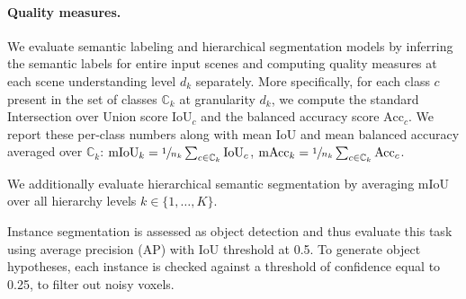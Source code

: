 

\paragraph{Quality measures. }
\label{results:metrics}
We evaluate semantic labeling and hierarchical segmentation models by inferring the semantic labels for entire input scenes and computing quality measures at each scene understanding level $d_k$ separately. 
More specifically, for each class $c$ present in the set of classes $\mathbb{C}_k$ at granularity $d_k$, we compute the standard Intersection over Union score $\text{IoU}_c$ and the balanced accuracy score $\text{Acc}_c$.
We report these per-class numbers along with mean IoU and mean balanced accuracy averaged over $\mathbb{C}_k$: $\text{mIoU}_k = \sfrac{1}{n_k}\sum_{c \in \mathbb{C}_k} \text{IoU}_c$, $\text{mAcc}_k = \sfrac{1}{n_k}\sum_{c \in \mathbb{C}_k} \text{Acc}_c$.

We additionally evaluate hierarchical semantic segmentation by averaging mIoU over all hierarchy levels $k \in \{1, \ldots, K\}$.

Instance segmentation is assessed as object detection and thus evaluate this task using average precision (AP) with IoU threshold at 0.5. To generate object hypotheses, each instance is checked against a threshold of confidence equal to 0.25, to filter out noisy voxels.




